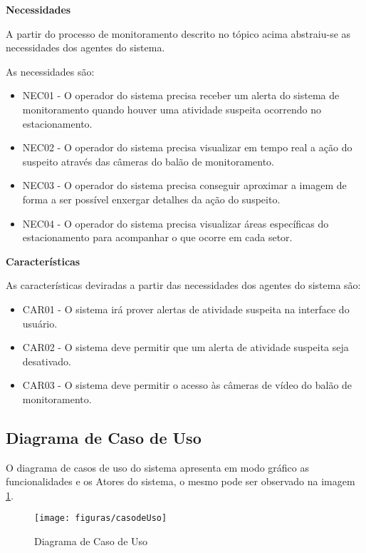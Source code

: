 \textbf{Necessidades}
\par
A partir do processo de monitoramento descrito no tópico acima abstraiu-se as necessidades dos agentes do sistema.

As necessidades são:
\begin{itemize}
	\item NEC01 - O operador do sistema precisa receber um alerta do sistema de monitoramento quando houver uma atividade suspeita ocorrendo no estacionamento.
	\item NEC02 - O operador do sistema precisa visualizar em tempo real a ação do suspeito através das câmeras do balão de monitoramento.
	\item NEC03 - O operador do sistema precisa conseguir aproximar a imagem de forma a ser possível enxergar detalhes da ação do suspeito.
	\item NEC04 - O operador do sistema precisa visualizar áreas específicas do estacionamento para acompanhar o que ocorre em cada setor.
\end{itemize}

\textbf{Características}
\par
As características deviradas a partir das necessidades dos agentes do sistema são:
\begin{itemize}
	\item CAR01 - O sistema irá prover alertas de atividade suspeita na interface do usuário.
	\item CAR02 - O sistema deve permitir que um alerta de atividade suspeita seja desativado.
	\item CAR03 - O sistema deve permitir o acesso às câmeras de vídeo do balão de monitoramento.
\end{itemize}

\subsection{Diagrama de Caso de Uso}

O diagrama de casos de uso do sistema apresenta em modo gráfico as funcionalidades e os Atores do sistema, o mesmo pode ser observado na imagem \ref{img:Casos de Uso}.
\begin{figure}[H]
	\centering
	\caption{Diagrama de Caso de Uso}
	\texttt{[image: figuras/casodeUso]}
	\label{img:Casos de Uso}
\end{figure}

